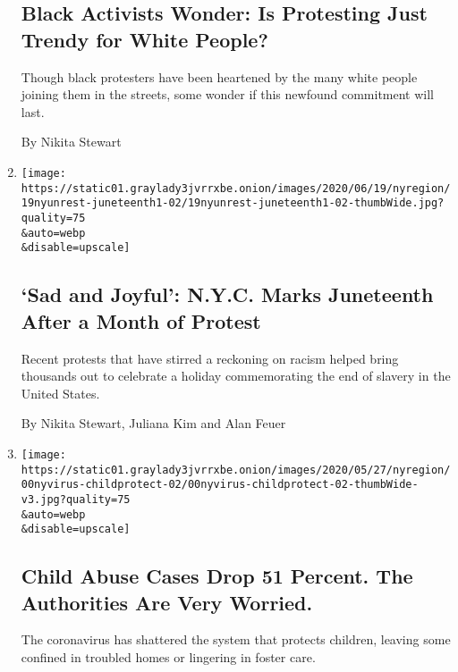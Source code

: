 \begin{enumerate}
  \hypertarget{black-activists-wonder-is-protesting-just-trendy-for-white-people}{%
  \subsection{Black Activists Wonder: Is Protesting Just Trendy for
  White
  People?}\label{black-activists-wonder-is-protesting-just-trendy-for-white-people}}

  Though black protesters have been heartened by the many white people
  joining them in the streets, some wonder if this newfound commitment
  will last.

  By Nikita Stewart
\item
  \href{/2020/06/19/nyregion/juneteenth-in-nyc.html}{}

  \texttt{[image: https://static01.graylady3jvrrxbe.onion/images/2020/06/19/nyregion/19nyunrest-juneteenth1-02/19nyunrest-juneteenth1-02-thumbWide.jpg?quality=75\\\&auto=webp\\\&disable=upscale]}

  \hypertarget{sad-and-joyful-nyc-marks-juneteenth-after-a-month-of-protest}{%
  \subsection{`Sad and Joyful': N.Y.C. Marks Juneteenth After a Month of
  Protest}\label{sad-and-joyful-nyc-marks-juneteenth-after-a-month-of-protest}}

  Recent protests that have stirred a reckoning on racism helped bring
  thousands out to celebrate a holiday commemorating the end of slavery
  in the United States.

  By Nikita Stewart, Juliana Kim and Alan Feuer
\item
  \href{/2020/06/09/nyregion/coronavirus-nyc-child-abuse.html}{}

  \texttt{[image: https://static01.graylady3jvrrxbe.onion/images/2020/05/27/nyregion/00nyvirus-childprotect-02/00nyvirus-childprotect-02-thumbWide-v3.jpg?quality=75\\\&auto=webp\\\&disable=upscale]}

  \hypertarget{child-abuse-cases-drop-51-percent-the-authorities-are-very-worried}{%
  \subsection{Child Abuse Cases Drop 51 Percent. The Authorities Are
  Very
  Worried.}\label{child-abuse-cases-drop-51-percent-the-authorities-are-very-worried}}

  The coronavirus has shattered the system that protects children,
  leaving some confined in troubled homes or lingering in foster care.


\end{enumerate}
